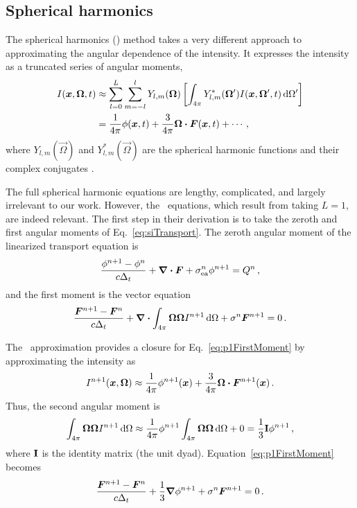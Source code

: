 \subsection{Spherical harmonics}\label{sec:bgPn}
The spherical harmonics (\PN) method takes a very different approach to
approximating the angular dependence of the intensity. It expresses the
intensity as a truncated series of angular moments,
\begin{align*}
  I(\bm{x},\bm{\Omega},t)
  &\approx \sum_{l=0}^{L} \sum_{m=-l}^{l} Y_{l,m}(\bm{\Omega}) \left[
  \int_{4\pi} Y_{l,m}^\ast(\bm{\Omega}') I(\bm{x},\bm{\Omega}',t) \mathop{}\!\mathrm{d} \Omega'
  \right]
  \\
  &= \frac{1}{4\pi} \phi(\bm{x}, t) + \frac{3}{4\pi} \bm{\Omega}\bm{\cdot}
  \bm{F}(\bm{x},t) + \cdots\,,
\end{align*}
where $Y_{l,m}(\vec{\Omega})$ and $Y_{l,m}^*(\vec{\Omega})$ are the spherical
harmonic functions and their complex conjugates \cite{McC2008a,Lar2007}.

The full spherical harmonic equations \cite{McC2007} are lengthy, complicated, and
largely irrelevant to our work. However, the \Pone\ equations, which result from
taking $L=1$, are indeed relevant. The first step in their derivation is to take the
zeroth and first angular moments of Eq.~\eqref{eq:siTransport}. The zeroth
angular moment of the linearized transport equation is
\begin{equation}\label{eq:p1ZerothMoment}
  \frac{\phi^{n+1} - \phi^n }{c \Delta_t}
  + \bm{\nabla} \bm{\cdot} \bm{F}
  + \sigma_\mathrm{ea}^n \phi^{n+1}
  = Q^n\,,
\end{equation}
and the first moment is the vector equation
\begin{equation}\label{eq:p1FirstMoment}
  \frac{\bm{F}^{n+1} - \bm{F}^n }{c \Delta_t} + \bm{\nabla} \bm{\cdot} \int_{4\pi}
  \bm{\Omega}\bm{\Omega} I^{n+1} \mathop{}\!\mathrm{d}\Omega
  + \sigma^n \bm{F}^{n+1}
  = 0\,.
\end{equation}

The \Pone\ approximation provides a closure for Eq.~\eqref{eq:p1FirstMoment} by
approximating the intensity as
\begin{equation}\label{eq:p1Approx}
  I^{n+1}(\bm{x},\bm{\Omega})
  \approx \frac{1}{4\pi} \phi^{n+1}(\bm{x})
  + \frac{3}{4\pi} \bm{\Omega}\bm{\cdot} \bm{F}^{n+1}(\bm{x}) \,.
\end{equation}
Thus, the second angular moment is
\begin{equation*}
  \int_{4\pi} \bm{\Omega}\bm{\Omega} I^{n+1} \mathop{}\!\mathrm{d}\Omega
  \approx \frac{1}{4\pi} \phi^{n+1}
  \int_{4\pi} \bm{\Omega}\bm{\Omega}\mathop{}\!\mathrm{d}\Omega + 0
  = \frac{1}{3} \mathbf{I} \phi^{n+1}\,,
\end{equation*}
where $\mathbf{I}$ is the identity matrix (the unit dyad).
Equation~\eqref{eq:p1FirstMoment} becomes
\begin{equation} \label{eq:p1FirstMoment2}
  \frac{\bm{F}^{n+1} - \bm{F}^n }{c \Delta_t} + \frac{1}{3} \bm{\nabla} \phi^{n+1}
  + \sigma^n \bm{F}^{n+1}
  = 0\,.
\end{equation}

